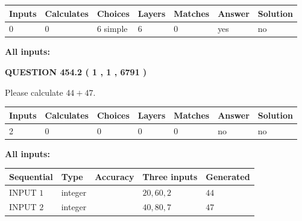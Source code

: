 \documentclass[12pt]{article}
\begin{document}
 
   
   
   
   
\noindent\begin{tabular}{|l|l|l|l|l|l|l|}
 \hline
Inputs & Calculates & Choices & Layers & Matches & Answer & Solution \\ \hline
 0  & 
 0  & 
 6
  simple  
  & 
 6  & 
 0  & 
  yes & 
  no 
  \\ \hline
 \end{tabular}
   
   
   
   
\noindent{}
   
   
   
   
\noindent\vspace{0.1in}\hspace{-0.08in} {\textbf{\Large{All inputs: }}}
   
   
  
\vspace{0.2in}
  
{\textbf{\Large{QUESTION
454.2 
 ( 1 , 1 , 6791 )
}}}
  
  
 
Please calculate $ %
44 +  %
47 $.
 
 
   
   
   
   
\noindent\begin{tabular}{|l|l|l|l|l|l|l|}
 \hline
Inputs & Calculates & Choices & Layers & Matches & Answer & Solution \\ \hline
 2  & 
 0  & 
 0
  & 
 0  & 
 0  & 
  no & 
  no 
  \\ \hline
 \end{tabular}
   
   
   
   
\noindent{}
   
   
   
   
\noindent\vspace{0.1in}\hspace{-0.08in} {\textbf{\Large{All inputs: }}}
   
   
  
  
\noindent\begin{tabular}{|l|l|l|l|l|}
\hline
 Sequential & Type & Accuracy & Three inputs & Generated \\ 
\hline
 
 
  INPUT $  1 $ & integer &  & $
 20
 , 
 60
 , 
 2
 $ & $ 44 $ 
 \\  \hline  
 
 
  INPUT $  2 $ & integer &  & $
 40
 , 
 80
 , 
 7
 $ & $ 47 $ 
 \\  \hline  
 \end{tabular}
   
\end{document}
